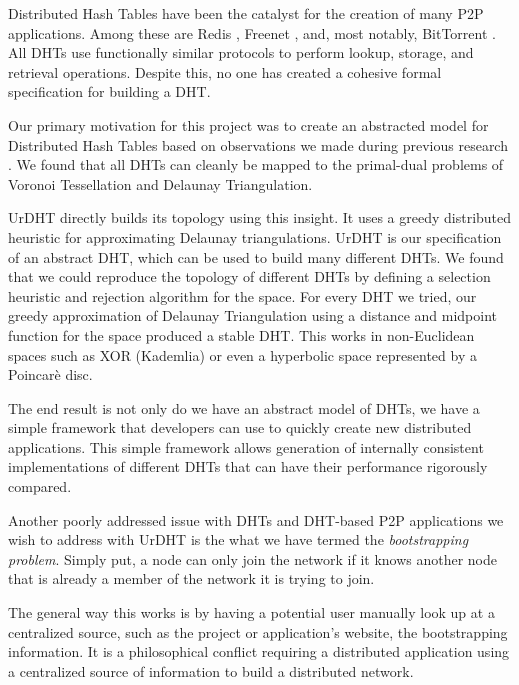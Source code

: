 \documentclass[11pt,conference]{IEEEtran}
\begin{document}
Distributed Hash Tables have been the catalyst for the creation of many P2P applications.
Among these are Redis \cite{redis}, Freenet \cite{freenet}, and, most notably, BitTorrent \cite{bittorrent}. 
All DHTs use functionally similar protocols to perform lookup, storage, and retrieval operations.
Despite this, no one has created a cohesive formal specification for building a DHT.

Our primary motivation for this project was to create an abstracted model for Distributed Hash Tables based on observations we made during previous research \cite{dgvh}.
We found that all DHTs can cleanly be mapped to the primal-dual problems of Voronoi Tessellation and Delaunay Triangulation.

UrDHT directly builds its topology using this insight.
It uses a greedy distributed heuristic for approximating Delaunay triangulations.
UrDHT is our specification of an abstract DHT, which can be used to build many different DHTs.
We found that we could reproduce the topology of different DHTs by defining a selection heuristic and rejection algorithm for the space.
For every DHT we tried, our greedy approximation of Delaunay Triangulation using a distance and midpoint function for the space produced a stable DHT.  
This works in non-Euclidean spaces such as XOR (Kademlia)  or even a hyperbolic space represented by a Poincar\`{e} disc.

The end result is not only do we have an abstract model of DHTs, we have a simple framework that developers can use to quickly create new distributed applications.
This simple framework allows generation of internally consistent implementations of different DHTs that can have their performance rigorously compared.  %



Another poorly addressed issue with DHTs and DHT-based P2P applications we wish to address with UrDHT is the what we have termed the \textit{bootstrapping problem}.
Simply put, a node can only join the network if it knows another node that is already a member of the network it is trying to join.

The general way this works is by having a potential user manually look up at a centralized source, such as the project or application's website, the bootstrapping information.
It is a philosophical conflict requiring a distributed application using a centralized source of information to build a distributed network.
\end{document}
